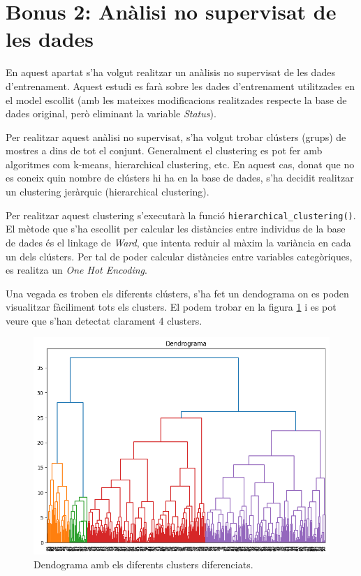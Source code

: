 \section{Bonus 2: Anàlisi no supervisat de les dades}

En aquest apartat s'ha volgut realitzar un anàlisis no supervisat de les dades d'entrenament. Aquest estudi es farà sobre les dades d'entrenament utilitzades en el model escollit (amb les mateixes modificacions realitzades respecte la base de dades original, però eliminant la variable \textit{Status}).

Per realitzar aquest anàlisi no supervisat, s'ha volgut trobar clústers (grups) de mostres a dins de tot el conjunt. Generalment el clustering es pot fer amb algoritmes com k-means, hierarchical clustering, etc. En aquest cas, donat que no es coneix quin nombre de clústers hi ha en la base de dades, s'ha decidit realitzar un clustering jeràrquic (hierarchical clustering).

Per realitzar aquest clustering s'executarà la funció \texttt{hierarchical\_clustering()}. El mètode que s'ha escollit per calcular les distàncies entre individus de la base de dades és el linkage de \textit{Ward}, que intenta reduir al màxim la variància en cada un dels clústers. Per tal de poder calcular distàncies entre variables categòriques, es realitza un \textit{One Hot Encoding}.

Una vegada es troben els diferents clústers, s'ha fet un dendograma on es poden visualitzar fàciliment tots els clusters. El podem trobar en la figura \ref{fig:dendogram} i es pot veure que s'han detectat clarament 4 clusters.

\begin{figure}[H]
	\centering
	\includegraphics[width=0.85\linewidth]{img/dendogram.png}
	\caption{Dendograma amb els diferents clusters diferenciats.}
	\label{fig:dendogram}
\end{figure}

